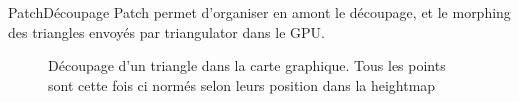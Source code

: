 \documentclass[french]{beamer}
\begin{document}
 \begin{frame}{Patch}{Découpage}
 Patch permet d'organiser en amont le découpage, et le morphing des triangles envoyés par triangulator dans le GPU.
 \begin{figure}
\caption{Découpage d'un triangle dans la carte graphique. Tous les points sont cette fois ci normés selon leurs position dans la heightmap}

\centerline{
}
\end{figure}
\end{frame}
\end{document}
